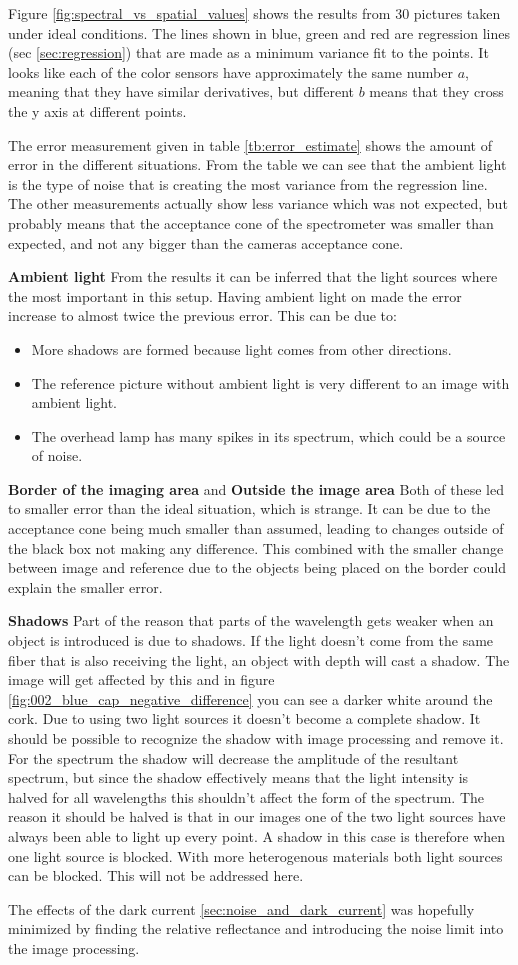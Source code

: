 Figure \ref{fig:spectral_vs_spatial_values} shows the results from 30 pictures taken under ideal conditions. The lines shown in blue, green and red are regression lines (sec \ref{sec:regression}) that are made as a minimum variance fit to the points. It looks like each of the color sensors have approximately the same number $a$, meaning that they have similar derivatives, but different $b$ means that they cross the y axis at different points. 

The error measurement given in table \ref{tb:error_estimate} shows the amount of error in the different situations. From the table we can see that the ambient light is the type of noise that is creating the most variance from the regression line. The other measurements actually show less variance which was not expected, but probably means that the acceptance cone of the spectrometer was smaller than expected, and not any bigger than the cameras acceptance cone. 

\textbf{Ambient light}
From the results it can be inferred that the light sources where the most important in this setup. Having ambient light on made the error increase to almost twice the previous error. This can be due to: 
\begin{itemize}
    \item More shadows are formed because light comes from other directions. 
    \item The reference picture without ambient light is very different to an image with ambient light. 
    \item The overhead lamp has many spikes in its spectrum, which could be a source of noise. 
\end{itemize}


\textbf{Border of the imaging area} and \textbf{Outside the image area}
Both of these led to smaller error than the ideal situation, which is strange. It can be due to the acceptance cone being much smaller than assumed, leading to changes outside of the black box not making any difference. This combined with the smaller change between image and reference due to the objects being placed on the border could explain the smaller error. 

\textbf{Shadows}
Part of the reason that parts of the wavelength gets weaker when an object is introduced is due to shadows. If the light doesn't come from the same fiber that is also receiving the light, an object with depth will cast a shadow. The image will get affected by this and in figure \ref{fig:002_blue_cap_negative_difference} you can see a darker white around the cork. Due to using two light sources it doesn't become a complete shadow. It should be possible to recognize the shadow with image processing and remove it. For the spectrum the shadow will decrease the amplitude of the resultant spectrum, but since the shadow effectively means that the light intensity is halved for all wavelengths this shouldn't affect the form of the spectrum. The reason it should be halved is that in our images one of the two light sources have always been able to light up every point. A shadow in this case is therefore when one light source is blocked. With more heterogenous materials both light sources can be blocked. This will not be addressed here.



The effects of the dark current \ref{sec:noise_and_dark_current} was hopefully minimized by finding the relative reflectance and introducing the noise limit into the image processing. 
